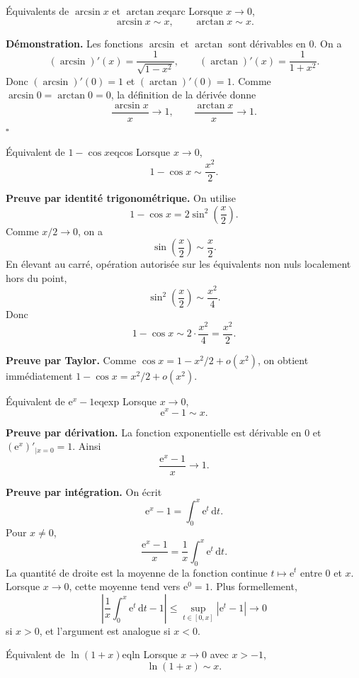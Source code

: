 \documentclass[11pt,a4paper]{article}
\newcommand{\e}{\mathrm{e}}
\newcommand{\dd}{\mathrm{d}}
\begin{document}
\begin{propositionbox}{Équivalents de $\arcsin x$ et $\arctan x$}{eqarc}
Lorsque $x\to0$,
\[
  \arcsin x\sim x,\qquad \arctan x\sim x.
\]
\end{propositionbox}

\textbf{Démonstration.} Les fonctions $\arcsin$ et $\arctan$ sont dérivables en $0$. On a
\[
  (\arcsin)'(x)=\frac1{\sqrt{1-x^2}},\qquad (\arctan)'(x)=\frac1{1+x^2}.
\]
Donc $(\arcsin)'(0)=1$ et $(\arctan)'(0)=1$. Comme $\arcsin0=\arctan0=0$, la définition de la dérivée donne
\[
  \frac{\arcsin x}{x}\to1,
  \qquad
  \frac{\arctan x}{x}\to1.
\]
\hfill $\square$

\begin{propositionbox}{Équivalent de $1-\cos x$}{eqcos}
Lorsque $x\to0$,
\[
  1-\cos x\sim \frac{x^2}{2}.
\]
\end{propositionbox}

\textbf{Preuve par identité trigonométrique.} On utilise
\[
  1-\cos x=2\sin^2\left(\frac{x}{2}\right).
\]
Comme $x/2\to0$, on a
\[
  \sin\left(\frac{x}{2}\right)\sim \frac{x}{2}.
\]
En élevant au carré, opération autorisée sur les équivalents non nuls localement hors du point,
\[
  \sin^2\left(\frac{x}{2}\right)\sim \frac{x^2}{4}.
\]
Donc
\[
  1-\cos x\sim 2\cdot\frac{x^2}{4}=\frac{x^2}{2}.
\]

\textbf{Preuve par Taylor.} Comme $\cos x=1-x^2/2+o(x^2)$, on obtient immédiatement $1-\cos x=x^2/2+o(x^2)$.

\begin{propositionbox}{Équivalent de $\e^x-1$}{eqexp}
Lorsque $x\to0$,
\[
  \e^x-1\sim x.
\]
\end{propositionbox}

\textbf{Preuve par dérivation.} La fonction exponentielle est dérivable en $0$ et $(\e^x)'_{|x=0}=1$. Ainsi
\[
  \frac{\e^x-1}{x}\to1.
\]

\textbf{Preuve par intégration.} On écrit
\[
  \e^x-1=\int_0^x \e^t\,\dd t.
\]
Pour $x\ne0$,
\[
  \frac{\e^x-1}{x}=\frac1x\int_0^x \e^t\,\dd t.
\]
La quantité de droite est la moyenne de la fonction continue $t\mapsto\e^t$ entre $0$ et $x$. Lorsque $x\to0$, cette moyenne tend vers $\e^0=1$. Plus formellement,
\[
\left|\frac1x\int_0^x \e^t\,\dd t-1\right|
\le \sup_{t\in[0,x]}|\e^t-1|\to0
\]
si $x>0$, et l'argument est analogue si $x<0$.

\begin{propositionbox}{Équivalent de $\ln(1+x)$}{eqln}
Lorsque $x\to0$ avec $x>-1$,
\[
  \ln(1+x)\sim x.
\]
\end{propositionbox}
\end{document}

